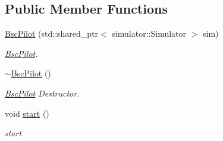 \subsection*{Public Member Functions}
\begin{DoxyCompactItemize}
\item 
\hyperlink{classBscPilot_a78e73052c348955803e00bed5dfa5e4b}{Bsc\+Pilot} (std\+::shared\+\_\+ptr$<$ simulator\+::\+Simulator $>$ sim)
\begin{DoxyCompactList}\small\item\em \hyperlink{classBscPilot}{Bsc\+Pilot}. \end{DoxyCompactList}\item 
\mbox{\label{classBscPilot_aea2409ea259e0870345c2fcbc7be8099}} 
\hyperlink{classBscPilot_aea2409ea259e0870345c2fcbc7be8099}{$\sim$\+Bsc\+Pilot} ()
\begin{DoxyCompactList}\small\item\em \hyperlink{classBscPilot}{Bsc\+Pilot} Destructor. \end{DoxyCompactList}\item 
void \hyperlink{classBscPilot_a121a0ff2e9fc49b68d344d6785703702}{start} ()
\begin{DoxyCompactList}\small\item\em start \end{DoxyCompactList}\end{DoxyCompactItemize}
